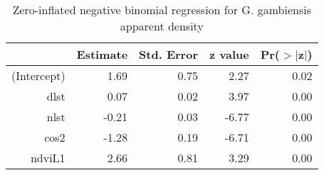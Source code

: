 \begin{table}[ht]
\centering
\caption{Zero-inflated negative binomial regression for G. gambiensis apparent density} 
\label{tab:gpgdapfit}
\begin{tabular}{rrrrr}
  \hline
 & Estimate & Std. Error & z value & Pr($>$$|$z$|$) \\ 
  \hline
(Intercept) & 1.69 & 0.75 & 2.27 & 0.02 \\ 
  dlst & 0.07 & 0.02 & 3.97 & 0.00 \\ 
  nlst & -0.21 & 0.03 & -6.77 & 0.00 \\ 
  cos2 & -1.28 & 0.19 & -6.71 & 0.00 \\ 
  ndviL1 & 2.66 & 0.81 & 3.29 & 0.00 \\ 
   \hline
\end{tabular}
\end{table}
